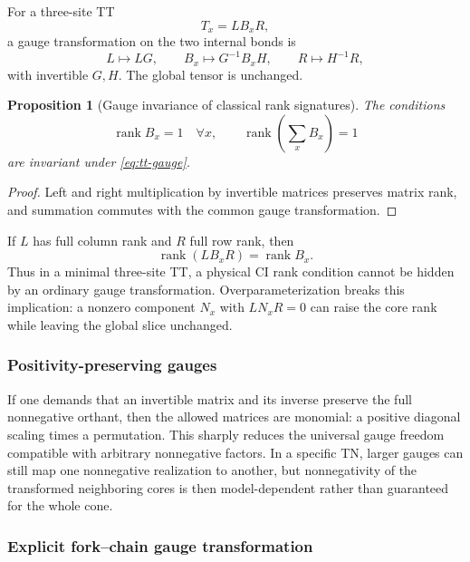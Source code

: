 \documentclass[11pt]{article}
\newtheorem{proposition}[definition]{Proposition}
\theoremstyle{remark}
\newcommand{\rank}{\operatorname{rank}}
\begin{document}
For a three-site TT
\begin{equation}
T_x=L B_x R,
\end{equation}
a gauge transformation on the two internal bonds is
\begin{equation}
L\mapsto LG,\qquad B_x\mapsto G^{-1}B_xH,\qquad R\mapsto H^{-1}R,
\label{eq:tt-gauge}
\end{equation}
with invertible $G,H$. The global tensor is unchanged.

\begin{proposition}[Gauge invariance of classical rank signatures]
\label{prop:gauge-rank}
The conditions
\begin{equation}
\rank B_x=1\quad\forall x,
\qquad
\rank\!\left(\sum_xB_x\right)=1
\end{equation}
are invariant under \cref{eq:tt-gauge}.
\end{proposition}
\begin{proof}
Left and right multiplication by invertible matrices preserves matrix rank, and summation commutes with the common gauge transformation.
\end{proof}

If $L$ has full column rank and $R$ full row rank, then
\begin{equation}
\rank(LB_xR)=\rank B_x.
\end{equation}
Thus in a minimal three-site TT, a physical CI rank condition cannot be hidden by an ordinary gauge transformation. Overparameterization breaks this implication: a nonzero component $N_x$ with $LN_xR=0$ can raise the core rank while leaving the global slice unchanged.

\subsubsection{Positivity-preserving gauges}

If one demands that an invertible matrix and its inverse preserve the full nonnegative orthant, then the allowed matrices are monomial: a positive diagonal scaling times a permutation. This sharply reduces the universal gauge freedom compatible with arbitrary nonnegative factors. In a specific TN, larger gauges can still map one nonnegative realization to another, but nonnegativity of the transformed neighboring cores is then model-dependent rather than guaranteed for the whole cone.

\subsubsection{Explicit fork--chain gauge transformation}
\label{sec:fork-chain-gauge}
\end{document}
